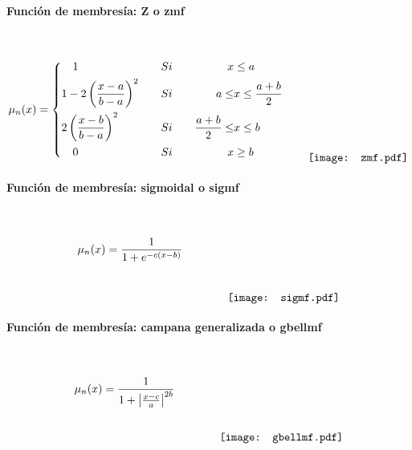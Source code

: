             \paragraph{Función de membresía: Z o zmf}$\quad$
                
                \begin{equation}\label{eq:zmf}
                    \mu_n(x) = \left\{
                        \begin{aligned}
                            &\quad 1  &\quad &Si \quad & x &\leq a\\
                            &1 - 2\left(\frac{x - a}{b - a}\right)^2  &\quad &Si \quad &  a \leq &x \leq \frac{a+b}{2} \\
                            &2\left(\frac{x - b}{b - a}\right)^2  &\quad &Si \quad & \frac{a+b}{2} \leq &x \leq b \\
                            &\quad 0  &\quad &Si \quad & x &\geq b
                        \end{aligned}\right.
                        \qquad
                        \raisebox{-15mm}{\texttt{[image: zmf.pdf]}}
                \end{equation}

            \paragraph{Función de membresía: sigmoidal o sigmf}$\quad$
                
                \begin{equation}\label{eq:sigmf}
                    \mu_n(x) = \frac{1}{1+e^{-c(x-b)}}
                        \qquad \qquad
                        \raisebox{-15mm}{\texttt{[image: sigmf.pdf]}}
                \end{equation}
               
            \paragraph{Función de membresía: campana generalizada o gbellmf}$\quad$
                
                \begin{equation}\label{eq:gbellmf}
                    \mu_n(x) = \frac{1}{1+ \left|\frac{x - c}{a}\right|^{2b}}
                        \qquad \qquad
                        \raisebox{-15mm}{\texttt{[image: gbellmf.pdf]}}
                \end{equation}

